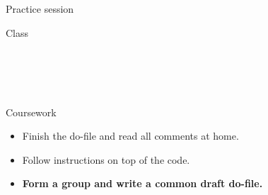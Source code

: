 \documentclass[t]{beamer}
\begin{document}
	\begin{frame}[t]{Practice session}

    \begin{block}{Class}
      \\
      \\
      
      \\
      \\
      \\
      
    \end{block}

    \begin{alertblock}{Coursework}
      \begin{itemize}
	       \item Finish the do-file and read all comments at home.
	       \item Follow instructions on top of the code.
	       \item \textbf{Form a group and write a common draft do-file.}
      \end{itemize}
    \end{alertblock}
    		
	\end{frame}
  
\end{document}
